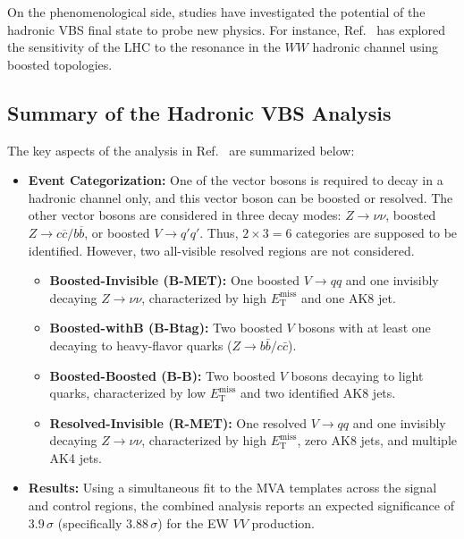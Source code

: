 \documentclass[12pt]{article}
\begin{document}
        On the phenomenological side, studies have investigated the potential of the hadronic VBS final state to probe new physics. For instance, Ref.~\cite{Delgado:2019} has explored the sensitivity of the LHC to the resonance in the $WW$ hadronic channel using boosted topologies.


    \subsection{Summary of the Hadronic VBS Analysis}%
    \label{sub:summary_of_the_hadronic_vbs_analysis}

        The key aspects of the analysis in Ref.~\cite{hu_2022} are summarized below:
        \begin{itemize}
            \item \textbf{Event Categorization:} One of the vector bosons is required to decay in a hadronic channel only, and this vector boson can be boosted or resolved. The other vector bosons are considered in three decay modes: $Z \to \nu\nu$, boosted $Z \to c \overline{c}/ b \overline{b}$, or boosted $V \to q'q'$. Thus, $2\times 3 =6$ categories are supposed to be identified. However, two all-visible resolved regions are not considered.
            \begin{itemize}
                \item \textbf{Boosted-Invisible (B-MET):} One boosted $V \to qq$ and one invisibly decaying $Z \to \nu\nu$, characterized by high $E_{\text{T}}^{\text{miss}}$ and one AK8 jet.
                \item \textbf{Boosted-withB (B-Btag):} Two boosted $V$ bosons with at least one decaying to heavy-flavor quarks ($Z \to b\bar{b}/c\bar{c}$).
                \item \textbf{Boosted-Boosted (B-B):} Two boosted $V$ bosons decaying to light quarks, characterized by low $E_{\text{T}}^{\text{miss}}$ and two identified AK8 jets.
                \item \textbf{Resolved-Invisible (R-MET):} One resolved $V \to qq$ and one invisibly decaying $Z \to \nu\nu$, characterized by high $E_{\text{T}}^{\text{miss}}$, zero AK8 jets, and multiple AK4 jets.
            \end{itemize}
            
            \item \textbf{Results:} Using a simultaneous fit to the MVA templates across the signal and control regions, the combined analysis reports an expected significance of $3.9\,\sigma$ (specifically $3.88\,\sigma$) for the EW $VV$ production.
        \end{itemize}
\end{document}
